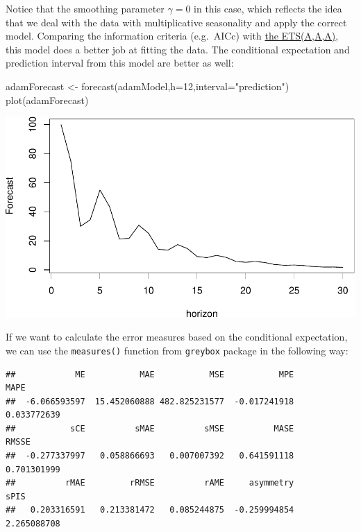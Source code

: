 \documentclass[
]{book}
\newenvironment{Shaded}{\begin{snugshade}}{\end{snugshade}}
\newcommand{\AttributeTok}[1]{\textcolor[rgb]{0.77,0.63,0.00}{#1}}
\newcommand{\DecValTok}[1]{\textcolor[rgb]{0.00,0.00,0.81}{#1}}
\newcommand{\FunctionTok}[1]{\textcolor[rgb]{0.00,0.00,0.00}{#1}}
\newcommand{\NormalTok}[1]{#1}
\newcommand{\OtherTok}[1]{\textcolor[rgb]{0.56,0.35,0.01}{#1}}
\newcommand{\SpecialCharTok}[1]{\textcolor[rgb]{0.00,0.00,0.00}{#1}}
\newcommand{\StringTok}[1]{\textcolor[rgb]{0.31,0.60,0.02}{#1}}
\theoremstyle{definition}
\theoremstyle{definition}
\theoremstyle{definition}
\theoremstyle{definition}
\theoremstyle{remark}
\begin{document}
Notice that the smoothing parameter \(\gamma=0\) in this case, which reflects the idea that we deal with the data with multiplicative seasonality and apply the correct model. Comparing the information criteria (e.g.~AICc) with \protect\hyperlink{ADAMETSPureAdditiveExamplesETSAAA}{the ETS(A,A,A)}, this model does a better job at fitting the data. The conditional expectation and prediction interval from this model are better as well:

\begin{Shaded}
\begin{Highlighting}[]
\NormalTok{adamForecast }\OtherTok{\textless{}{-}} \FunctionTok{forecast}\NormalTok{(adamModel,}\AttributeTok{h=}\DecValTok{12}\NormalTok{,}\AttributeTok{interval=}\StringTok{"prediction"}\NormalTok{)}
\FunctionTok{plot}\NormalTok{(adamForecast)}
\end{Highlighting}
\end{Shaded}

\includegraphics{adam_files/figure-latex/unnamed-chunk-40-1.pdf}

If we want to calculate the error measures based on the conditional expectation, we can use the \texttt{measures()} function from \texttt{greybox} package in the following way:

\begin{Shaded}
\end{Shaded}

\begin{verbatim}
##            ME           MAE           MSE           MPE          MAPE 
##  -6.066593597  15.452060888 482.825231577  -0.017241918   0.033772639 
##           sCE          sMAE          sMSE          MASE         RMSSE 
##  -0.277337997   0.058866693   0.007007392   0.641591118   0.701301999 
##          rMAE         rRMSE          rAME     asymmetry          sPIS 
##   0.203316591   0.213381472   0.085244875  -0.259994854   2.265088708
\end{verbatim}
\end{document}
